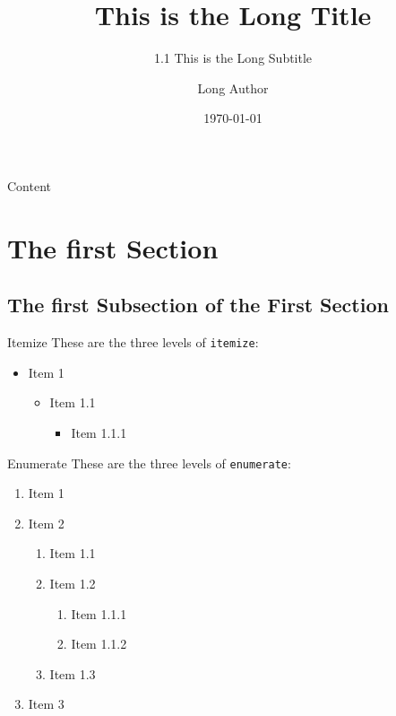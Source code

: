 \documentclass[aspectratio=169]{beamer} %
\title[Short Title]{This is the Long Title}
\subtitle[1.1 Short Subtitle]{1.1 This is the Long Subtitle}
\author[Short Author]{Long Author}
\date{\today}
\begin{document}
    


    \begin{frame}{Content}
        \tableofcontents
    \end{frame}
    
    \section[First Section]{The first Section}

    \subsection[First Subsection]{The first Subsection of the First Section}

    \begin{frame}{Itemize}
        These are the three levels of \texttt{itemize}:
        \begin{itemize}
            \item Item 1
            \begin{itemize}
                \item Item 1.1
                \begin{itemize}
                    \item Item 1.1.1
                \end{itemize}
            \end{itemize}
        \end{itemize}
    \end{frame}

    \begin{frame}{Enumerate}
        These are the three levels of \texttt{enumerate}:
        \begin{enumerate}
            \item Item 1
            \item Item 2
            \begin{enumerate}
                \item Item 1.1
                \item Item 1.2
                \begin{enumerate}
                    \item Item 1.1.1
                    \item Item 1.1.2
                \end{enumerate}
                \item Item 1.3
            \end{enumerate}
            \item Item 3
        \end{enumerate}
    \end{frame}
\end{document}
